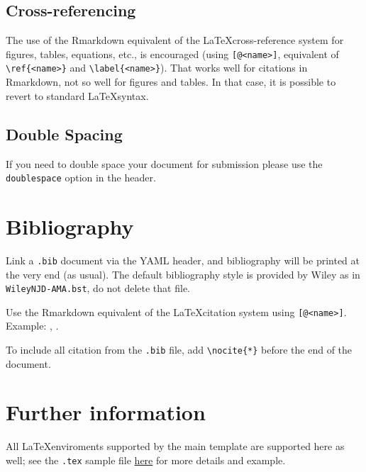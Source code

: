 \documentclass[Royal,times,sageh]{sagej}
\begin{document}
\hypertarget{cross-referencing}{%
\subsection{Cross-referencing}\label{cross-referencing}}

The use of the Rmarkdown equivalent of the \LaTeX cross-reference system
for figures, tables, equations, etc., is encouraged (using
\texttt{{[}@\textless{}name\textgreater{}{]}}, equivalent of
\texttt{\textbackslash{}ref\{\textless{}name\textgreater{}\}} and
\texttt{\textbackslash{}label\{\textless{}name\textgreater{}\}}). That
works well for citations in Rmarkdown, not so well for figures and
tables. In that case, it is possible to revert to standard
\LaTeX syntax.

\hypertarget{double-spacing}{%
\subsection{Double Spacing}\label{double-spacing}}

If you need to double space your document for submission please use the
\texttt{doublespace} option in the header.

\hypertarget{bibliography}{%
\section{Bibliography}\label{bibliography}}

Link a \texttt{.bib} document via the YAML header, and bibliography will
be printed at the very end (as usual). The default bibliography style is
provided by Wiley as in \texttt{WileyNJD-AMA.bst}, do not delete that
file.

Use the Rmarkdown equivalent of the \LaTeX citation system using
\texttt{{[}@\textless{}name\textgreater{}{]}}. Example:
\citep{Taylor1937}, \citep{Knupp1999, Kamm2000}.

To include all citation from the \texttt{.bib} file, add
\texttt{\textbackslash{}nocite\{*\}} before the end of the document.

\hypertarget{further-information}{%
\section{Further information}\label{further-information}}

All \LaTeX enviroments supported by the main template are supported here
as well; see the \texttt{.tex} sample file
\href{http://onlinelibrary.wiley.com/journal/10.1002/(ISSN)1097-0258/homepage/la_tex_class_file.htm}{here}
for more details and example.



\end{document}

